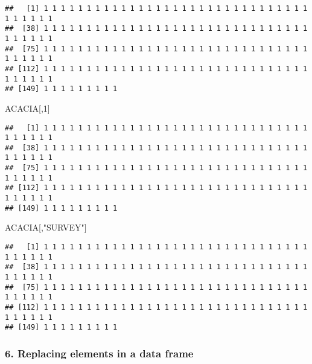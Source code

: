 \documentclass[
]{article}
\newenvironment{Shaded}{\begin{snugshade}}{\end{snugshade}}
\newcommand{\DecValTok}[1]{\textcolor[rgb]{0.00,0.00,0.81}{#1}}
\newcommand{\NormalTok}[1]{#1}
\newcommand{\SpecialCharTok}[1]{\textcolor[rgb]{0.00,0.00,0.00}{#1}}
\newcommand{\StringTok}[1]{\textcolor[rgb]{0.31,0.60,0.02}{#1}}
\begin{document}
\begin{Shaded}
\end{Shaded}

\begin{verbatim}
##   [1] 1 1 1 1 1 1 1 1 1 1 1 1 1 1 1 1 1 1 1 1 1 1 1 1 1 1 1 1 1 1 1 1 1 1 1 1 1
##  [38] 1 1 1 1 1 1 1 1 1 1 1 1 1 1 1 1 1 1 1 1 1 1 1 1 1 1 1 1 1 1 1 1 1 1 1 1 1
##  [75] 1 1 1 1 1 1 1 1 1 1 1 1 1 1 1 1 1 1 1 1 1 1 1 1 1 1 1 1 1 1 1 1 1 1 1 1 1
## [112] 1 1 1 1 1 1 1 1 1 1 1 1 1 1 1 1 1 1 1 1 1 1 1 1 1 1 1 1 1 1 1 1 1 1 1 1 1
## [149] 1 1 1 1 1 1 1 1 1
\end{verbatim}

\begin{Shaded}
\begin{Highlighting}[]
\NormalTok{ACACIA[,}\DecValTok{1}\NormalTok{]}
\end{Highlighting}
\end{Shaded}

\begin{verbatim}
##   [1] 1 1 1 1 1 1 1 1 1 1 1 1 1 1 1 1 1 1 1 1 1 1 1 1 1 1 1 1 1 1 1 1 1 1 1 1 1
##  [38] 1 1 1 1 1 1 1 1 1 1 1 1 1 1 1 1 1 1 1 1 1 1 1 1 1 1 1 1 1 1 1 1 1 1 1 1 1
##  [75] 1 1 1 1 1 1 1 1 1 1 1 1 1 1 1 1 1 1 1 1 1 1 1 1 1 1 1 1 1 1 1 1 1 1 1 1 1
## [112] 1 1 1 1 1 1 1 1 1 1 1 1 1 1 1 1 1 1 1 1 1 1 1 1 1 1 1 1 1 1 1 1 1 1 1 1 1
## [149] 1 1 1 1 1 1 1 1 1
\end{verbatim}

\begin{Shaded}
\begin{Highlighting}[]
\NormalTok{ACACIA[,}\StringTok{"SURVEY"}\NormalTok{]}
\end{Highlighting}
\end{Shaded}

\begin{verbatim}
##   [1] 1 1 1 1 1 1 1 1 1 1 1 1 1 1 1 1 1 1 1 1 1 1 1 1 1 1 1 1 1 1 1 1 1 1 1 1 1
##  [38] 1 1 1 1 1 1 1 1 1 1 1 1 1 1 1 1 1 1 1 1 1 1 1 1 1 1 1 1 1 1 1 1 1 1 1 1 1
##  [75] 1 1 1 1 1 1 1 1 1 1 1 1 1 1 1 1 1 1 1 1 1 1 1 1 1 1 1 1 1 1 1 1 1 1 1 1 1
## [112] 1 1 1 1 1 1 1 1 1 1 1 1 1 1 1 1 1 1 1 1 1 1 1 1 1 1 1 1 1 1 1 1 1 1 1 1 1
## [149] 1 1 1 1 1 1 1 1 1
\end{verbatim}

\hypertarget{replacing-elements-in-a-data-frame}{%
\subsubsection{6. Replacing elements in a data
frame}\label{replacing-elements-in-a-data-frame}}
\end{document}
